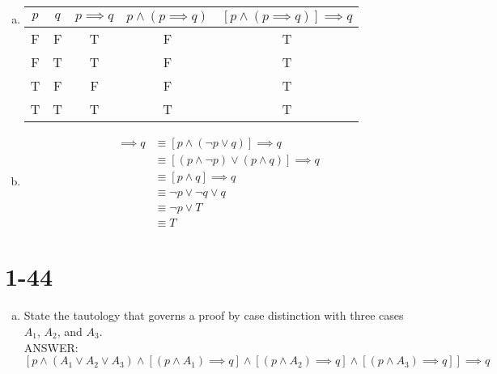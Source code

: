 \documentclass{article}
\begin{document}
\begin{enumerate}[a)]
    \item
        \begin{tabular}{ |c|c|c|c|c| }
            \hline
                $p$ & $q$ & $p \implies q$ & $p \land (p \implies q)$ & $[p \land (p \implies q)] \implies q$ \\
            \hline
                F   & F   & T              & F                        & T                                   \\
                F   & T   & T              & F                        & T                                   \\
                T   & F   & F              & F                        & T                                   \\
                T   & T   & T              & T                        & T                                   \\
            \hline
        \end{tabular}

    \item
        \begin{align*}
            [p \land (p \implies q)] \implies q
            &\equiv [p \land (\neg p \lor q)] \implies q \\
            &\equiv [(p \land \neg p) \lor (p \land q)] \implies q \\
            &\equiv [p \land q] \implies q \\
            &\equiv \neg p \lor \neg q \lor q \\
            &\equiv \neg p \lor T \\
            &\equiv T
        \end{align*}

\end{enumerate}

\section{1-44}

\begin{enumerate}[a)]
    \item State the tautology that governs a proof by case distinction with
        three cases $A_1$, $A_2$, and $A_3$. \\
        ANSWER: $$
        \left[
            p
            \land (A_1 \lor A_2 \lor A_3)
            \land \left[(p \land A_1) \implies q\right]
            \land \left[(p \land A_2) \implies q\right]
            \land \left[(p \land A_3) \implies q\right]
        \right] \implies q
        $$
\end{enumerate}
\end{document}
